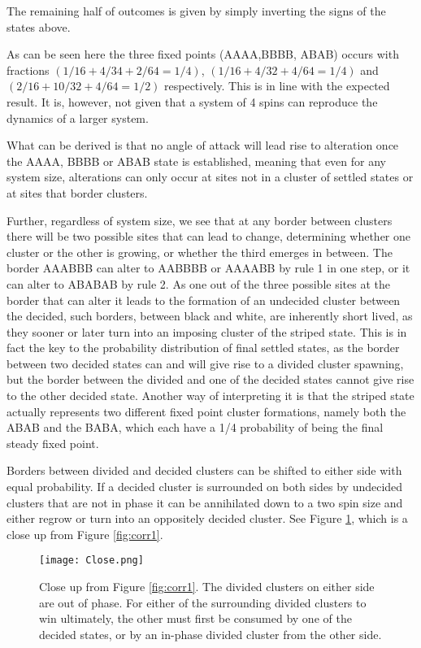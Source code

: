 \documentclass[a4paper]{article}
\begin{document}
The remaining half of outcomes is given by simply inverting the signs of the states above. 

 As can be seen here the three fixed points (AAAA,BBBB, ABAB) occurs with fractions $(1/16+4/34+2/64=1/4)$,  $(1/16+4/32+4/64=1/4)$ and $(2/16+10/32+4/64=1/2)$ respectively. This is in line with the expected result. It is, however, not given that a system of 4 spins can reproduce the dynamics of a larger system. 
 
What can be derived is that no angle of attack will lead rise to alteration once the AAAA, BBBB or ABAB state is established, meaning that even for any system size, alterations can only occur at sites not in a cluster of settled states or at sites that border clusters. 

Further, regardless of system size, we see that at any border between clusters there will be two possible sites that can lead to change, determining whether one cluster or the other is growing, or whether the third emerges in between. The border AAABBB can alter to AABBBB  or AAAABB by rule 1 in one step, or it can alter to ABABAB by rule 2. As one out of the three possible sites at the border that can alter it leads to the formation of an undecided cluster between the decided, such borders, between black and white, are inherently short lived, as they sooner or later turn into an imposing cluster of the striped state. This is in fact the key to the probability distribution of final settled states, as the border between two decided states can and will give rise to a divided cluster spawning, but the border between the divided and one of the decided states cannot give rise to the other decided state. Another way of interpreting it is that the striped state actually represents two different fixed point cluster formations, namely both the ABAB and the BABA, which each have a 1/4 probability of being the final steady fixed point.

Borders between divided and decided clusters can be shifted to either side with equal probability. If a decided cluster is surrounded on both sides by undecided clusters that are not in phase it can be annihilated down to a two spin size and either regrow or turn into an oppositely decided cluster. See Figure \ref{fig:close}, which is a close up from Figure \ref{fig:corr1}. 

\begin{figure}[H]
 \centerline{\texttt{[image: Close.png]}}
 \caption{Close up from Figure \ref{fig:corr1}. The divided clusters on either side are out of phase. For either of the surrounding divided clusters to win ultimately, the other must first be consumed by one of the decided states, or by an in-phase divided cluster from the other side.}
 \label{fig:close}
\end{figure}
\end{document}
